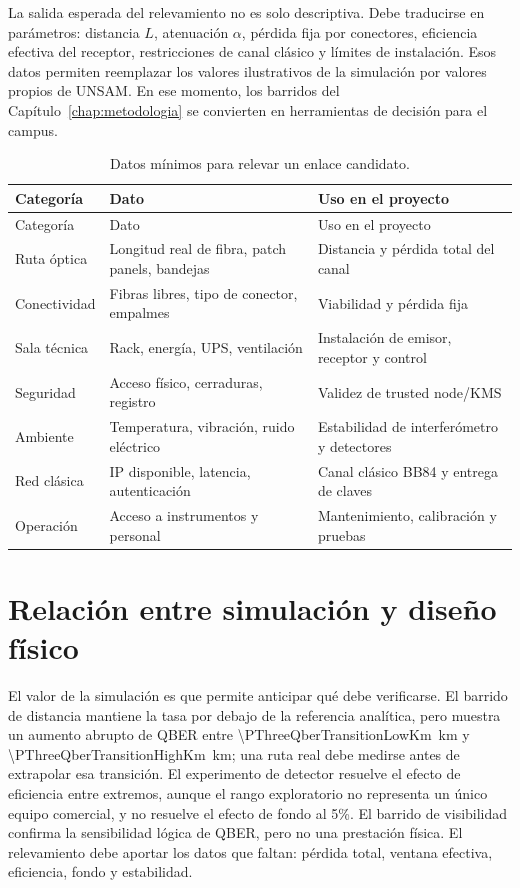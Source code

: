 La salida esperada del relevamiento no es solo descriptiva. Debe traducirse en parámetros: distancia \(L\), atenuación \(\alpha\), pérdida fija por conectores, eficiencia efectiva del receptor, restricciones de canal clásico y límites de instalación. Esos datos permiten reemplazar los valores ilustrativos de la simulación por valores propios de UNSAM. En ese momento, los barridos del Capítulo~\ref{chap:metodologia} se convierten en herramientas de decisión para el campus.

\begin{longtable}{p{}p{}p{}}
  \caption{Datos mínimos para relevar un enlace candidato.}
  \label{tab:datos_relevamiento}\\
  \toprule
  Categoría & Dato & Uso en el proyecto \\
  \midrule
  \endfirsthead
  \toprule
  Categoría & Dato & Uso en el proyecto \\
  \midrule
  \endhead
  Ruta óptica & Longitud real de fibra, patch panels, bandejas & Distancia y pérdida total del canal \\
  Conectividad & Fibras libres, tipo de conector, empalmes & Viabilidad y pérdida fija \\
  Sala técnica & Rack, energía, UPS, ventilación & Instalación de emisor, receptor y control \\
  Seguridad & Acceso físico, cerraduras, registro & Validez de trusted node/KMS \\
  Ambiente & Temperatura, vibración, ruido eléctrico & Estabilidad de interferómetro y detectores \\
  Red clásica & IP disponible, latencia, autenticación & Canal clásico BB84 y entrega de claves \\
  Operación & Acceso a instrumentos y personal & Mantenimiento, calibración y pruebas \\
  \bottomrule
\end{longtable}

\section{Relación entre simulación y diseño físico}

El valor de la simulación es que permite anticipar qué debe verificarse. El barrido de distancia mantiene la tasa por debajo de la referencia analítica, pero muestra un aumento abrupto de QBER entre \SI[round-mode=places,round-precision=2]{\PThreeQberTransitionLowKm}{\kilo\meter} y \SI[round-mode=places,round-precision=2]{\PThreeQberTransitionHighKm}{\kilo\meter}; una ruta real debe medirse antes de extrapolar esa transición. El experimento de detector resuelve el efecto de eficiencia entre extremos, aunque el rango exploratorio no representa un único equipo comercial, y no resuelve el efecto de fondo al 5\%. El barrido de visibilidad confirma la sensibilidad lógica de QBER, pero no una prestación física. El relevamiento debe aportar los datos que faltan: pérdida total, ventana efectiva, eficiencia, fondo y estabilidad.

